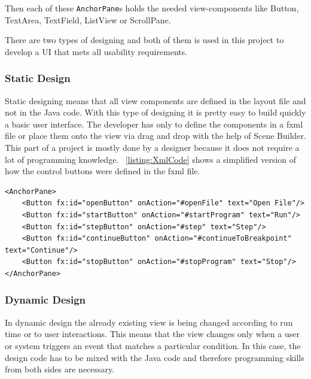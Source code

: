 Then each of these \lstinline$AnchorPane$s holds the needed view-components like Button, TextArea, TextField, ListView or ScrollPane.

There are two types of designing and both of them is used in this project to develop a UI that mets all usability requirements.

\subsubsection{Static Design}
Static designing means that all view components are defined in the layout file and not in the Java code. With this type of designing it is pretty easy to build quickly a basic user interface. The developer has only to define the components in a fxml file or place them onto the view via drag and drop with the help of Scene Builder. This part of a project is mostly done by a designer because it does not require a lot of programming knowledge. ~\ref{listing:XmlCode} shows a simplified version of how the control buttons were defined in the fxml file.
\lstset{language=XML,style=MyStyle}
\begin{lstlisting}[caption={FXML example}, label=listing:XmlCode]
<AnchorPane>
	<Button fx:id="openButton" onAction="#openFile" text="Open File"/>
	<Button fx:id="startButton" onAction="#startProgram" text="Run"/>
	<Button fx:id="stepButton" onAction="#step" text="Step"/>
	<Button fx:id="continueButton" onAction="#continueToBreakpoint" text="Continue"/>
	<Button fx:id="stopButton" onAction="#stopProgram" text="Stop"/>
</AnchorPane>
\end{lstlisting}

\subsubsection{Dynamic Design}
In dynamic design the already existing view is being changed according to run time  or to user interactions. This means that the view changes only when a user or system triggers an event that matches a particular condition. In this case, the design code has to be mixed with the Java code and therefore programming skills from both sides are necessary. 

